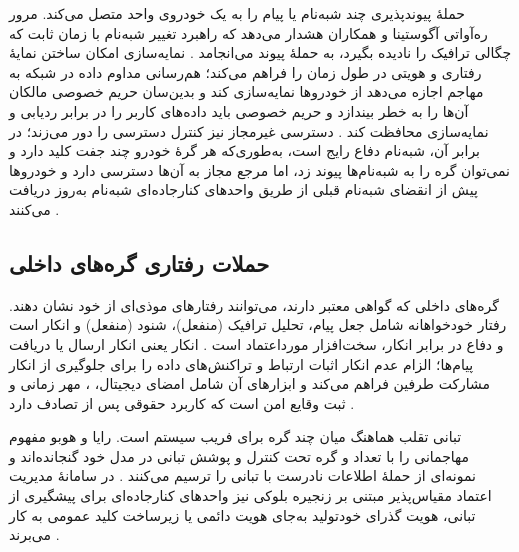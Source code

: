 حملهٔ پیوندپذیری  چند شبه‌نام یا پیام را به یک خودروی واحد متصل می‌کند. مرور ره‌آواتی آگوستینا و همکاران هشدار می‌دهد که راهبرد تغییر شبه‌نام با زمان ثابت که چگالی ترافیک را نادیده بگیرد، به حملهٔ پیوند می‌انجامد \cite{rahmawatiagustinaSystematicLiteratureReview2025}. نمایه‌سازی  امکان ساختن نمایهٔ رفتاری و هویتی در طول زمان را فراهم می‌کند؛ هم‌رسانی مداوم داده در شبکه به مهاجم اجازه می‌دهد از خودروها نمایه‌سازی کند و بدین‌سان حریم خصوصی مالکان آن‌ها را به خطر بیندازد \cite{rahmawatiagustinaSystematicLiteratureReview2025} و حریم خصوصی باید داده‌های کاربر را در برابر ردیابی و نمایه‌سازی محافظت کند \cite{VanetSecurityPrivacy}. دسترسی غیرمجاز نیز کنترل دسترسی را دور می‌زند؛ در برابر آن، شبه‌نام دفاع رایج است، به‌طوری‌که هر گرهٔ خودرو چند جفت کلید دارد و نمی‌توان گره را به شبه‌نام‌ها پیوند زد، اما مرجع مجاز به آن‌ها دسترسی دارد و خودروها پیش از انقضای شبه‌نام قبلی از طریق واحدهای کنارجاده‌ای شبه‌نام به‌روز دریافت می‌کنند \cite{farsimadanReviewSecurityChallenges2025}.

\subsection{حملات رفتاری گره‌های داخلی}

گره‌های داخلی که گواهی معتبر دارند، می‌توانند رفتارهای موذی‌ای از خود نشان دهند. رفتار خودخواهانه  شامل جعل پیام، تحلیل ترافیک (منفعل)، شنود (منفعل) و انکار است و دفاع در برابر انکار، سخت‌افزار مورداعتماد است \cite{farsimadanReviewSecurityChallenges2025}. انکار  یعنی انکار ارسال یا دریافت پیام‌ها؛ الزام عدم انکار اثبات ارتباط و تراکنش‌های داده را برای جلوگیری از انکار مشارکت طرفین فراهم می‌کند و ابزارهای آن شامل امضای دیجیتال، ، مهر زمانی و ثبت وقایع امن است که کاربرد حقوقی پس از تصادف دارد \cite{VanetSecurityPrivacy}.

تبانی  تقلب هماهنگ میان چند گره برای فریب سیستم است. رایا و هوبو مفهوم مهاجمانی را با تعداد  و  گره تحت کنترل و پوشش تبانی در مدل خود گنجانده‌اند و نمونه‌ای از حملهٔ اطلاعات نادرست با تبانی را ترسیم می‌کنند \cite{SecuringVehicularAd}. در سامانهٔ مدیریت اعتماد مقیاس‌پذیر مبتنی بر زنجیره بلوکی نیز واحدهای کنارجاده‌ای برای پیشگیری از تبانی، هویت گذرای خودتولید به‌جای هویت دائمی یا زیرساخت کلید عمومی به کار می‌برند \cite{ghovanlooyghajarSBTMSScalableBlockchain2021}.

